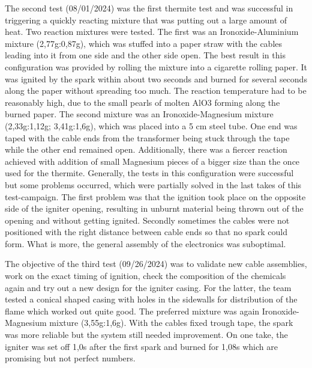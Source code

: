         The second test (08/01/2024) was the first thermite test and was successful in triggering a quickly reacting mixture that was putting out a large amount of heat. Two reaction mixtures were tested. The first was an Ironoxide-Aluminium mixture (2,77g:0,87g), which was stuffed into a paper straw with the cables leading into it from one side and the other side open. The best result in this configuration was provided by rolling the mixture into a cigarette rolling paper. It was ignited by the spark within about two seconds and burned for several seconds along the paper without spreading too much. The reaction temperature had to be reasonably high, due to the small pearls of molten AlO3 forming along the burned paper.  
        The second mixture was an Ironoxide-Magnesium mixture (2,33g:1,12g; 3,41g:1,6g), which was placed into a 5 cm steel tube. One end was taped with the cable ends from the transformer being stuck through the tape while the other end remained open. Additionally, there was a fiercer reaction achieved with addition of small Magnesium pieces of a bigger size than the once used for the thermite. Generally, the tests in this configuration were successful but some problems occurred, which were partially solved in the last takes of this test-campaign. The first problem was that the ignition took place on the opposite side of the igniter opening, resulting in unburnt material being thrown out of the opening and without getting ignited. Secondly sometimes the cables were not positioned with the right distance between cable ends so that no spark could form. What is more, the general assembly of the electronics was suboptimal. 

        The objective of the third test (09/26/2024) was to validate new cable assemblies, work on the exact timing of ignition, check the composition of the chemicals again and try out a new design for the igniter casing. For the latter, the team tested a conical shaped casing with holes in the sidewalls for distribution of the flame which worked out quite good. The preferred mixture was again Ironoxide-Magnesium mixture (3,55g:1,6g). With the cables fixed trough tape, the spark was more reliable but the system still needed improvement. On one take, the igniter was set off 1,0s after the first spark and burned for 1,08s which are promising but not perfect numbers. 

